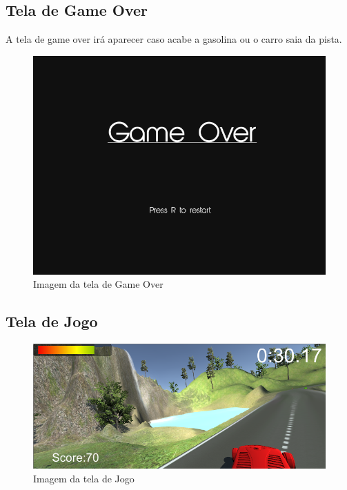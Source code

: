 \subsection{Tela de Game Over}

A tela de game over irá aparecer caso acabe a gasolina ou o carro saia da pista. \\

\begin{figure}[!h]
	\centering
		\includegraphics[scale=0.3]{figuras/game_over}
	\caption{Imagem da tela de Game Over}
\end{figure}

\subsection{Tela de Jogo}

\begin{figure}[!h]
	\centering
		\includegraphics[scale=0.4]{figuras/tela_jogo}
	\caption{Imagem da tela de Jogo}
\end{figure}